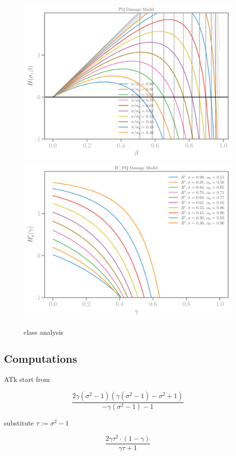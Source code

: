 \documentclass[]{article}
\begin{document}
\begin{figure}[htbp]
  \includegraphics[width=.33\textheight]{../figures/pq-Hbeta.pdf}
  \includegraphics[width=.33\textheight]{../figures/pq-H-prime-beta.pdf}
  \caption{class analysis}
  \label{fig:class-analyser}
\end{figure}



\clearpage

\subsection*{Computations}
ATk
start from 

$$
\frac{2 \gamma \left(\sigma^{2} - 1\right) \left(\gamma \left(\sigma^{2} - 1\right) - \sigma^{2} + 1\right)}{- \gamma \left(\sigma^{2} - 1\right) - 1}
$$

substitute $\tau := \sigma^2 - 1$

\begin{equation}
  \label{eqn:}
  \frac{2 \gamma \tau^{2} \cdot \left(1 - \gamma\right)}{\gamma \tau + 1}
\end{equation}
\end{document}
